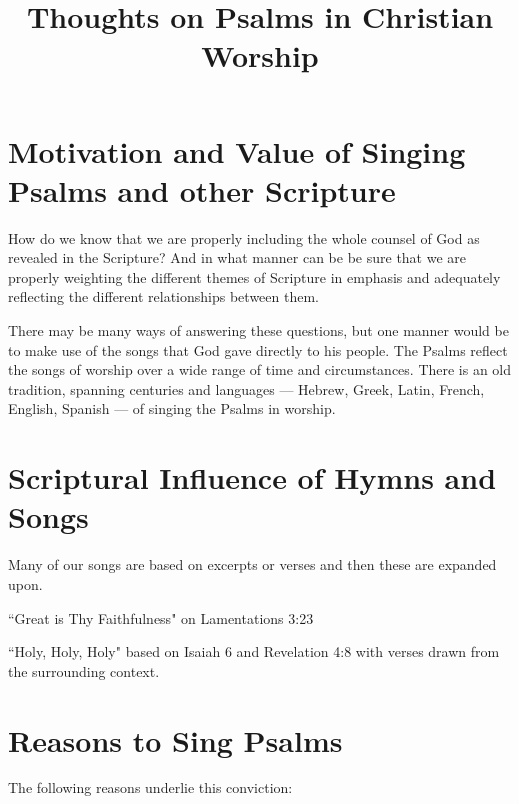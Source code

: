 \documentclass{article}
\title{Thoughts on Psalms in Christian Worship}
\begin{document}
\maketitle


\section{Motivation and Value of Singing Psalms and other Scripture}

How do we know that we are properly including the whole counsel of God as revealed in the Scripture? And in what manner can be be sure that we are properly weighting the different themes of Scripture in emphasis and adequately reflecting the different relationships between them.

There may be many ways of answering these questions, but one manner would be to make use of the songs that God gave directly to his people.  The Psalms reflect the songs of worship over a wide range of time and circumstances.  There is an old tradition, spanning centuries and languages --- Hebrew, Greek, Latin, French, English, Spanish --- of singing the Psalms in worship.

\section{Scriptural Influence of Hymns and Songs}

Many of our songs are based on excerpts or verses and then these are expanded upon.

``Great is Thy Faithfulness" on Lamentations 3:23

``Holy, Holy, Holy" based on Isaiah 6 and Revelation 4:8 with verses drawn from the surrounding context. 

\section{Reasons to Sing Psalms}

The following reasons underlie this conviction:
\end{document}
